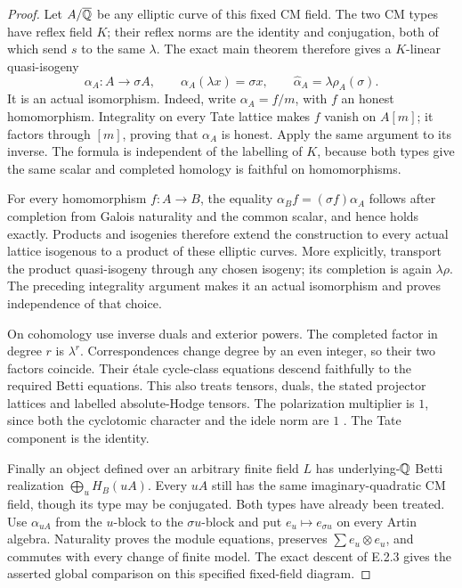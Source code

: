 \begin{proof}
Let \(A/\overline{\mathbb Q}\) be any elliptic curve of this fixed CM field.
The two CM types have reflex field \(K\); their reflex
norms are the identity and conjugation, both of which
send \(s\) to the same \(\lambda\).
The exact main theorem
\cite[Theorem 9.10, p.~78]{GenMilneCM2020} therefore gives
a \(K\)-linear quasi-isogeny
\[
 \alpha_A:A\longrightarrow\sigma A,\qquad
 \alpha_A(\lambda x)=\sigma x,
 \qquad
 \widehat\alpha_A=\lambda\rho_A(\sigma).
 \tag{E.2.19c}
\]
It is an actual isomorphism. Indeed, write
\(\alpha_A=f/m\), with \(f\) an honest homomorphism.
Integrality on every Tate lattice makes \(f\) vanish
on \(A[m]\); it factors through \([m]\), proving that
\(\alpha_A\) is honest. Apply the same argument to
its inverse. The formula is independent of the labelling
of \(K\), because both types give the same scalar and
completed homology is faithful on homomorphisms.

For every homomorphism \(f:A\to B\), the equality
\(\alpha_Bf=(\sigma f)\alpha_A\) follows after completion
from Galois naturality and the common scalar, and hence
holds exactly. Products and isogenies therefore extend
the construction to every actual lattice isogenous to
a product of these elliptic curves. More explicitly,
transport the product quasi-isogeny through any chosen
isogeny; its completion is again \(\lambda\rho\).
The preceding integrality argument makes it an actual
isomorphism and proves independence of that choice.

On cohomology use inverse duals and exterior powers.
The completed factor in degree \(r\) is \(\lambda^r\).
Correspondences change degree by an even integer, so
their two factors coincide. Their étale cycle-class
equations descend faithfully to the required Betti
equations. This also treats tensors, duals, the stated
projector lattices and labelled absolute-Hodge tensors.
The polarization multiplier is \(1\), since both the
cyclotomic character and the idele norm are \(1\)
\cite[Remark 9.11(c), p.~78]{GenMilneCM2020}.
The Tate component is the identity.

Finally an object defined over an arbitrary finite
field \(L\) has underlying-\(\mathbb Q\) Betti realization
\(\bigoplus_u H_B(uA)\). Every \(uA\) still has the
same imaginary-quadratic CM field, though its type
may be conjugated. Both types have already been
treated. Use \(\alpha_{uA}\) from the \(u\)-block to
the \(\sigma u\)-block and put \(e_u\mapsto e_{\sigma u}\)
on every Artin algebra. Naturality proves the module
equations, preserves \(\sum e_u\otimes e_u\), and
commutes with every change of finite model.
The exact descent of E.2.3 gives the asserted global
comparison on this specified fixed-field diagram.
\end{proof}

